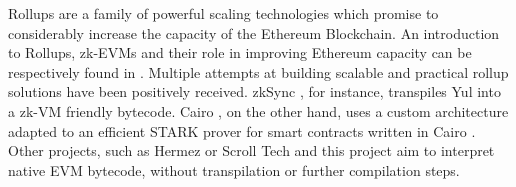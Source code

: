 Rollups are a family of powerful scaling technologies which promise to considerably increase the capacity of the Ethereum Blockchain. An introduction to Rollups, zk-EVMs and their role in improving Ethereum capacity can be respectively found in \cite{vitalik_rollup_2021, mediumZKEVM}. Multiple attempts at building scalable and practical rollup solutions have been positively received. zkSync \cite{zksync}, for instance, transpiles Yul into a zk-VM friendly bytecode. Cairo \cite{cairo}, on the other hand, uses a custom architecture adapted to an efficient STARK prover for smart contracts written in Cairo . Other projects, such as Hermez \cite{hermez} or Scroll Tech \cite{scroll} and this project aim to interpret native EVM bytecode, without transpilation or further compilation steps.